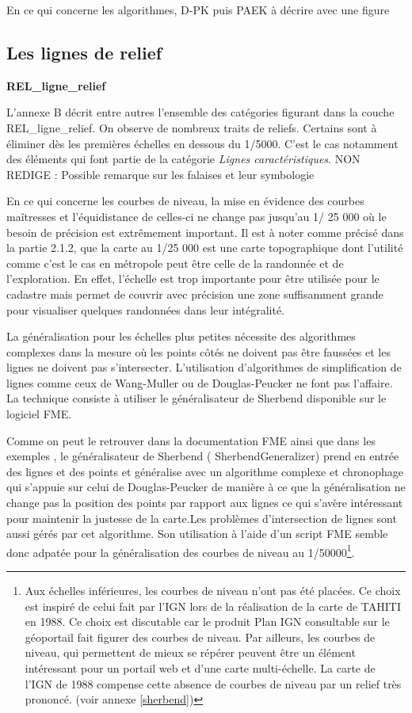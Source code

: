 En ce qui concerne les algorithmes, D-PK puis PAEK à décrire avec une figure

\subsection{Les lignes de relief}
\begin{center}
    \footnotesize
    \textbf{REL\_ligne\_relief}
\end{center}
L'annexe B décrit entre autres l'ensemble des catégories figurant dans la couche REL\_ligne\_relief. On observe de nombreux traits de reliefs. Certains sont à éliminer dès les premières échelles en dessous du 1/5000. C'est le cas notamment des éléments qui font partie de la catégorie \textit{Lignes caractéristiques}. 
{\color{magenta} NON REDIGE : Possible remarque sur les falaises et leur symbologie}

En ce qui concerne les courbes de niveau, la mise en évidence des courbes maîtresses et l'équidistance de celles-ci ne change pas jusqu'au 1/ 25 000 où le besoin de précision est extrêmement important. Il est à noter comme précisé dans la partie 2.1.2, que la carte au 1/25 000 est une carte topographique dont l'utilité comme c'est le cas en métropole peut être celle de la randonnée et de l'exploration. En effet, l'échelle est trop importante pour être utilisée pour le cadastre mais permet de couvrir avec précision une zone suffisamment grande pour visualiser quelques randonnées dans leur intégralité.

La généralisation pour les échelles plus petites nécessite des algorithmes complexes dans la mesure où les points côtés ne doivent pas être faussées et les lignes ne doivent pas s'intersecter. L'utilisation d'algorithmes de simplification de lignes comme ceux de Wang-Muller ou de Douglas-Peucker ne font pas l'affaire. La technique consiste à utiliser le généralisateur de Sherbend disponible sur le logiciel FME. 

Comme on peut le retrouver dans la documentation FME ainsi que dans les exemples \cite{sherbend}, le généralisateur de Sherbend ( SherbendGeneralizer) prend en entrée des lignes et des points et généralise avec un algorithme complexe et chronophage qui s'appuie sur celui de Douglas-Peucker de manière à ce que la généralisation ne change pas la position des points par rapport aux lignes ce qui s'avère intéressant pour maintenir la justesse de la carte.Les problèmes d'intersection de lignes sont aussi gérés par cet algorithme. Son utilisation à l'aide d'un script FME semble donc adpatée pour la généralisation des courbes de niveau au 1/50000\footnote{Aux échelles inférieures, les courbes de niveau n'ont pas été placées. Ce choix est inspiré de celui fait par l'IGN lors de la réalisation de la carte de TAHITI en 1988. Ce choix est discutable car le produit Plan IGN consultable sur le géoportail fait figurer des courbes de niveau. Par ailleurs, les courbes de niveau, qui permettent de mieux se répérer peuvent être un élément intéressant pour un portail web et d'une carte multi-échelle. La carte de l'IGN de 1988 compense cette absence de courbes de niveau par un relief très prononcé. (voir annexe \ref{sherbend})}.

